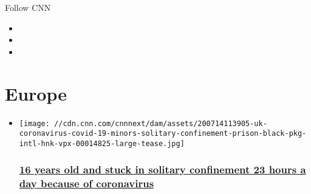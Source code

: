Follow CNN

\begin{itemize}
\item
\item
\item
\end{itemize}

\hypertarget{europe}{%
\section{Europe}\label{europe}}

\begin{itemize}
\item
  \href{/2020/07/14/europe/coronavirus-prisons-race-gbr-intl/index.html}{}

  \texttt{[image: //cdn.cnn.com/cnnnext/dam/assets/200714113905-uk-coronavirus-covid-19-minors-solitary-confinement-prison-black-pkg-intl-hnk-vpx-00014825-large-tease.jpg]}

  \hypertarget{16-years-old-and-stuck-in-solitary-confinement-23-hours-a-day-because-of-coronavirus}{%
  \subsubsection{\texorpdfstring{\href{/2020/07/14/europe/coronavirus-prisons-race-gbr-intl/index.html}{16
  years old and stuck in solitary confinement 23 hours a day because of
  coronavirus}}{16 years old and stuck in solitary confinement 23 hours a day because of coronavirus}}\label{16-years-old-and-stuck-in-solitary-confinement-23-hours-a-day-because-of-coronavirus}}
\end{itemize}

